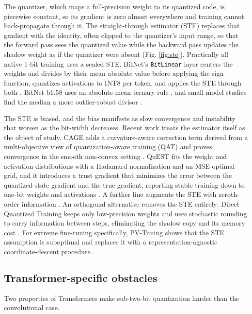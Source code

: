 \documentclass[11pt]{article}
\begin{document}
The quantizer, which maps a full-precision weight to its quantized code, is piecewise
constant, so its gradient is zero almost everywhere and training cannot back-propagate
through it. The straight-through estimator (STE) replaces that gradient with the
identity, often clipped to the quantizer's input range, so that the forward pass sees
the quantized value while the backward pass updates the shadow weight as if the
quantizer were absent \cite{Bengio2013-STE} (Fig. \ref{fig:ste}).
Practically all native 1-bit training uses a scaled STE. BitNet's \texttt{BitLinear} layer
centers the weights and divides by their mean absolute value before applying the sign
function, quantizes activations to INT8 per token, and applies the STE through both
\cite{Wang2023-BitNet,Wang2025-BitNetJMLR}. BitNet b1.58 uses an absolute-mean ternary
rule \cite{Ma2024-BitNetB158}, and small-model studies find the median a more
outlier-robust divisor \cite{Nielsen2024-Reloaded}.

The STE is biased, and the bias manifests as slow convergence and instability that
worsen as the bit-width decreases. Recent work treats the estimator itself as the
object of study. CAGE adds a curvature-aware correction term derived from a
multi-objective view of quantization-aware training (QAT) and proves convergence in the
smooth non-convex setting \cite{Tabesh2025-CAGE}. QuEST fits the weight and activation
distributions with a Hadamard normalization and an MSE-optimal grid, and it introduces
a trust gradient that minimizes the error between the quantized-state gradient and the
true gradient, reporting stable training down to one-bit weights and activations
\cite{Panferov2025-QuEST}. A further line augments the STE with zeroth-order information
\cite{Anon2025-STE-ZerothOrder}. An orthogonal alternative removes the STE entirely: Direct
Quantized Training keeps only low-precision weights and uses stochastic rounding to
carry information between steps, eliminating the shadow copy and its memory cost
\cite{Zhao2024-DQT}. For extreme fine-tuning specifically, PV-Tuning shows that the STE
assumption is suboptimal and replaces it with a representation-agnostic
coordinate-descent procedure \cite{Malinovskii2024-PVTuning}.

\subsection{Transformer-specific obstacles}

Two properties of Transformers make sub-two-bit quantization harder than the
convolutional case.
\end{document}
